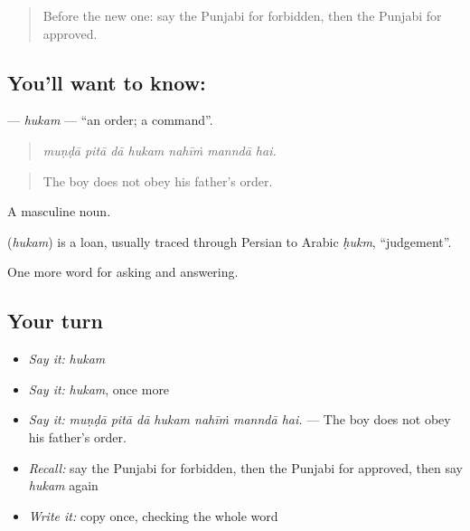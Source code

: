 \label{lesson:PA-C338-hukam}



\begin{quote}
Before the new one: say the Punjabi for forbidden, then the Punjabi for approved.
\end{quote}

\subsection*{You'll want to know: }
\textbf{} — \emph{hukam} — \textquotedblleft{}an order; a command\textquotedblright{}.

\begin{quote}
      
\end{quote}

\begin{quote}
\emph{muṇḍā pitā dā hukam nahīṁ manndā hai.}
\end{quote}

\begin{quote}
The boy does not obey his father's order.
\end{quote}

A masculine noun.

\begin{cousinweb}
\textbf{} (\emph{hukam}) is a loan, usually traced through Persian to Arabic \emph{ḥukm}, \textquotedblleft{}judgement\textquotedblright{}.
\end{cousinweb}

\begin{grammarlens}[title={What you've built}]
One more word for asking and answering.
\end{grammarlens}

\subsection*{Your turn}
\begin{itemize}
\raggedright
  \item \emph{Say it:} \emph{hukam}
  \item \emph{Say it:} \emph{hukam}, once more
  \item \emph{Say it:} \emph{muṇḍā pitā dā hukam nahīṁ manndā hai.} — The boy does not obey his father's order.
  \item \emph{Recall:} say the Punjabi for forbidden, then the Punjabi for approved, then say \emph{hukam} again
  \item \emph{Write it:} copy \textbf{} once, checking the whole word
\end{itemize}

